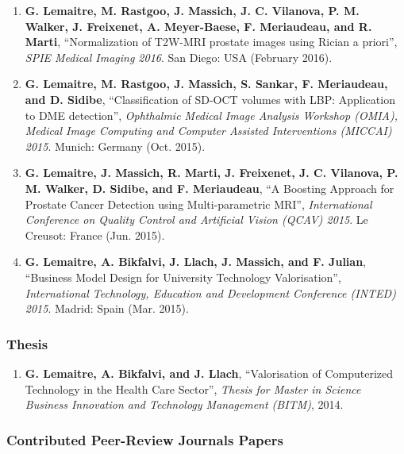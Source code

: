 \begin{publication}
\begin{enumerate}\scriptsize
\item \textbf{G. Lemaitre, M. Rastgoo, J. Massich, J. C. Vilanova, P. M. Walker, J. Freixenet, A. Meyer-Baese, F. Meriaudeau, and R. Marti}, ``Normalization of T2W-MRI prostate images using Rician a priori'', \textit{SPIE Medical Imaging 2016}. San Diego: USA (February 2016).
\item \textbf{G. Lemaitre, M. Rastgoo, J. Massich, S. Sankar, F. Meriaudeau, and D. Sidibe}, ``Classification of SD-OCT volumes with LBP: Application to DME detection'', \textit{Ophthalmic Medical Image Analysis Workshop (OMIA), Medical Image Computing and Computer Assisted Interventions (MICCAI) 2015}. Munich: Germany (Oct. 2015).
\item \textbf{G. Lemaitre, J. Massich, R. Marti, J. Freixenet, J. C. Vilanova, P. M. Walker, D. Sidibe, and F. Meriaudeau}, ``A Boosting Approach for Prostate Cancer Detection using Multi-parametric MRI'', \textit{International Conference on Quality Control and Artificial Vision (QCAV) 2015}. Le Creusot: France (Jun. 2015).
\item \textbf{G. Lemaitre, A. Bikfalvi, J. Llach, J. Massich, and F. Julian}, ``Business Model Design for University Technology Valorisation'', \textit{International Technology, Education and Development Conference (INTED) 2015}. Madrid: Spain (Mar. 2015).
\end{enumerate}

\subsubsection*{Thesis}

\begin{enumerate}\scriptsize
\item \textbf{G. Lemaitre, A. Bikfalvi, and J. Llach}, ``Valorisation of Computerized Technology in the Health Care Sector'', \textit{Thesis for Master in Science Business Innovation and Technology Management (BITM)}, 2014.
\end{enumerate}

\subsubsection*{Contributed Peer-Review Journals Papers}


\end{publication}
